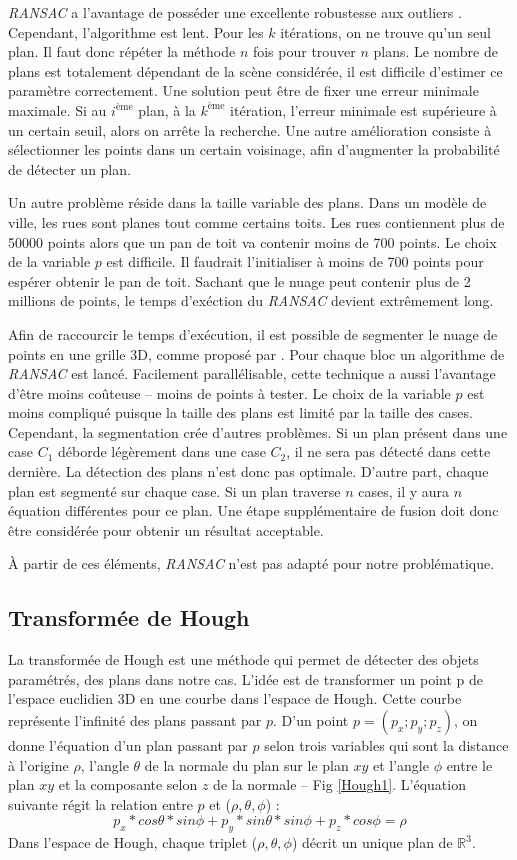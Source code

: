 \documentclass[12pt, twoside]{article}
\begin{document}
\textit{RANSAC} a l’avantage de posséder une excellente robustesse aux outliers \cite{RANSAC1}. Cependant, l’algorithme est lent. Pour les $k$ itérations, on ne trouve qu’un seul plan. Il faut donc répéter la méthode $n$ fois pour trouver $n$ plans. Le nombre de plans est totalement dépendant de la scène considérée, il est difficile d’estimer ce paramètre correctement. Une solution peut être de fixer une erreur minimale maximale. Si au $i^\text{ème}$ plan, à la $k^\text{ème}$ itération, l’erreur minimale est supérieure à un certain seuil, alors on arrête la recherche. Une autre amélioration consiste à sélectionner les points dans un certain voisinage, afin d’augmenter la probabilité de détecter un plan.

Un autre problème réside dans la taille variable des plans. Dans un modèle de ville, les rues sont planes tout comme certains toits. Les rues contiennent plus de 50000 points alors que un pan de toit va contenir moins de 700 points. Le choix de la variable $p$ est difficile. Il faudrait l'initialiser à moins de 700 points pour espérer obtenir le pan de toit. Sachant que le nuage peut contenir plus de 2 millions de points, le temps d'exéction du \textit{RANSAC} devient extrêmement long.

Afin de raccourcir le temps d'exécution, il est possible de segmenter le nuage de points en une grille 3D, comme proposé par \cite{RANSAC2}. Pour chaque bloc un algorithme de \textit{RANSAC} est lancé. Facilement parallélisable, cette technique a aussi l'avantage d'être moins coûteuse -- moins de points à tester. Le choix de la variable $p$ est moins compliqué puisque la taille des plans est limité par la taille des cases. Cependant, la segmentation crée d'autres problèmes. Si un plan présent dans une case $C_1$ déborde légèrement dans une case $C_2$, il ne sera pas détecté dans cette dernière. La détection des plans n'est donc pas optimale. D'autre part, chaque plan est segmenté sur chaque case. Si un plan traverse $n$ cases, il y aura $n$ équation différentes pour ce plan. Une étape supplémentaire de fusion doit donc être considérée pour obtenir un résultat acceptable.

À partir de ces éléments, \textit{RANSAC} n'est pas adapté pour notre problématique.

\subsection{Transformée de Hough}
La transformée de Hough est une méthode qui permet de détecter des objets paramétrés, des plans dans notre cas. L’idée est de transformer un point p de l’espace euclidien 3D en une courbe dans l’espace de Hough. Cette courbe représente l’infinité des plans passant par $p$. D’un point $p = (p_x; p_y; p_z)$, on donne l’équation d’un plan passant par $p$ selon trois variables qui sont la distance à l’origine $\rho$, l’angle $\theta$ de la normale du plan sur le plan $xy$ et l’angle $\phi$ entre le plan $xy$ et la composante selon $z$ de la normale -- Fig \ref{Hough1}. L’équation suivante régit la relation entre $p$ et ($\rho, \theta, \phi$) :
$$p_x*cos\theta * sin\phi + p_y*sin\theta*sin\phi + p_z*cos\phi = \rho$$
Dans l'espace de Hough, chaque triplet ($\rho, \theta, \phi$) décrit un unique plan de $\mathbb{R}^3$.
\end{document}
